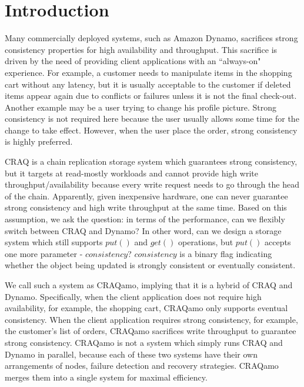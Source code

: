 \section{Introduction}
\label{sec:intro}

Many commercially deployed systems, such as Amazon Dynamo\cite{decandia2007dynamo}, sacrifices strong consistency properties for high availability and throughput. This sacrifice is driven by the need of providing client applications with an ``always-on" experience. For example, a customer needs to manipulate items in the shopping cart without any latency, but it is usually acceptable to the customer if deleted items appear again due to conflicts or failures unless it is not the final check-out. Another example may be a user trying to change his profile picture. Strong consistency is not required here because the user usually allows some time for the change to take effect. However, when the user place the order, strong consistency is highly preferred. 

CRAQ\cite{terrace2009object} is a chain replication storage system which guarantees strong consistency, but it targets at read-mostly workloads and cannot provide high write throughput/availability because every write request needs to go through the head of the chain. Apparently, given inexpensive hardware, one can never guarantee strong consistency and high write throughput at the same time. Based on this assumption, we ask the question: in terms of the performance, can we flexibly switch between CRAQ and Dynamo? In other word, can we design a storage system which still supports $put()$ and $get()$ operations, but $put()$ accepts one more parameter - $consistency$? $consistency$ is a binary flag indicating whether the object being updated is strongly consistent or eventually consistent. 

We call such a system as CRAQamo, implying that it is a hybrid of CRAQ and Dynamo. Specifically, when the client application does not require high availability, for example, the shopping cart, CRAQamo only supports eventual consistency. When the client application requires strong consistency, for example, the customer's list of orders, CRAQamo sacrifices write throughput to guarantee strong consistency. CRAQamo is not a system which simply runs CRAQ and Dynamo in parallel, because each of these two systems have their own arrangements of nodes, failure detection and recovery strategies. CRAQamo merges them into a single system for maximal efficiency.

